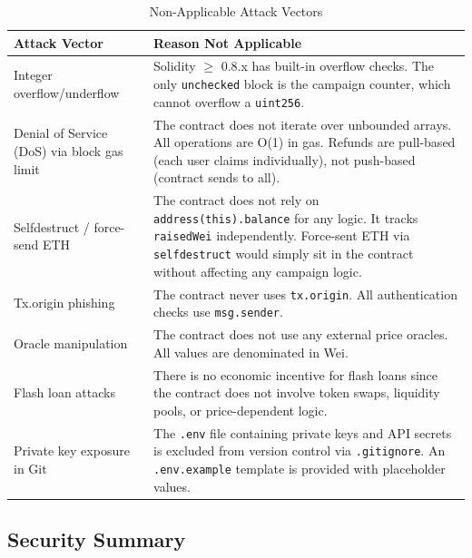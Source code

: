 \begin{table}[H]
\centering
\caption{Non-Applicable Attack Vectors}
\label{tab:nonapplicable}
\begin{tabularx}{\textwidth}{l X}
\toprule
\textbf{Attack Vector} & \textbf{Reason Not Applicable} \\
\midrule
Integer overflow/underflow & Solidity $\geq$ 0.8.x has built-in overflow checks. The only \texttt{unchecked} block is the campaign counter, which cannot overflow a \texttt{uint256}. \\
\addlinespace
Denial of Service (DoS) via block gas limit & The contract does not iterate over unbounded arrays. All operations are O(1) in gas. Refunds are pull-based (each user claims individually), not push-based (contract sends to all). \\
\addlinespace
Selfdestruct / force-send ETH & The contract does not rely on \texttt{address(this).balance} for any logic. It tracks \texttt{raisedWei} independently. Force-sent ETH via \texttt{selfdestruct} would simply sit in the contract without affecting any campaign logic. \\
\addlinespace
Tx.origin phishing & The contract never uses \texttt{tx.origin}. All authentication checks use \texttt{msg.sender}. \\
\addlinespace
Oracle manipulation & The contract does not use any external price oracles. All values are denominated in Wei. \\
\addlinespace
Flash loan attacks & There is no economic incentive for flash loans since the contract does not involve token swaps, liquidity pools, or price-dependent logic. \\
\addlinespace
Private key exposure in Git & The \texttt{.env} file containing private keys and API secrets is excluded from version control via \texttt{.gitignore}. An \texttt{.env.example} template is provided with placeholder values. \\
\bottomrule
\end{tabularx}
\end{table}

\subsection{Security Summary}

